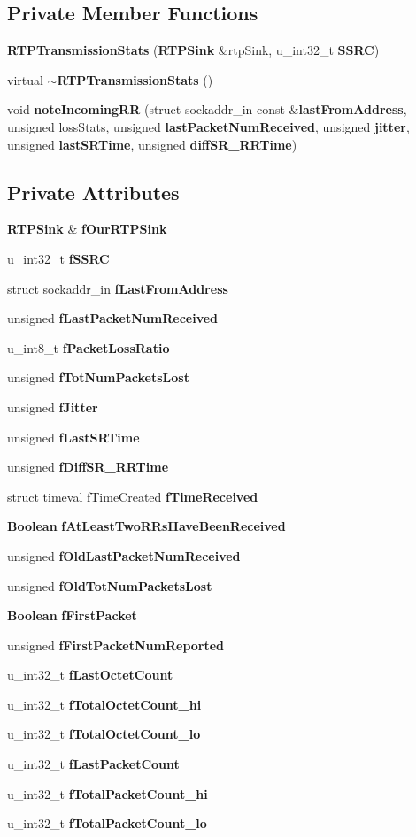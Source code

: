 \subsection*{Private Member Functions}
\begin{DoxyCompactItemize}
\item 
{\bf R\+T\+P\+Transmission\+Stats} ({\bf R\+T\+P\+Sink} \&rtp\+Sink, u\+\_\+int32\+\_\+t {\bf S\+S\+R\+C})
\item 
virtual {\bf $\sim$\+R\+T\+P\+Transmission\+Stats} ()
\item 
void {\bf note\+Incoming\+R\+R} (struct sockaddr\+\_\+in const \&{\bf last\+From\+Address}, unsigned loss\+Stats, unsigned {\bf last\+Packet\+Num\+Received}, unsigned {\bf jitter}, unsigned {\bf last\+S\+R\+Time}, unsigned {\bf diff\+S\+R\+\_\+\+R\+R\+Time})
\end{DoxyCompactItemize}
\subsection*{Private Attributes}
\begin{DoxyCompactItemize}
\item 
{\bf R\+T\+P\+Sink} \& {\bf f\+Our\+R\+T\+P\+Sink}
\item 
u\+\_\+int32\+\_\+t {\bf f\+S\+S\+R\+C}
\item 
struct sockaddr\+\_\+in {\bf f\+Last\+From\+Address}
\item 
unsigned {\bf f\+Last\+Packet\+Num\+Received}
\item 
u\+\_\+int8\+\_\+t {\bf f\+Packet\+Loss\+Ratio}
\item 
unsigned {\bf f\+Tot\+Num\+Packets\+Lost}
\item 
unsigned {\bf f\+Jitter}
\item 
unsigned {\bf f\+Last\+S\+R\+Time}
\item 
unsigned {\bf f\+Diff\+S\+R\+\_\+\+R\+R\+Time}
\item 
struct timeval f\+Time\+Created {\bf f\+Time\+Received}
\item 
{\bf Boolean} {\bf f\+At\+Least\+Two\+R\+Rs\+Have\+Been\+Received}
\item 
unsigned {\bf f\+Old\+Last\+Packet\+Num\+Received}
\item 
unsigned {\bf f\+Old\+Tot\+Num\+Packets\+Lost}
\item 
{\bf Boolean} {\bf f\+First\+Packet}
\item 
unsigned {\bf f\+First\+Packet\+Num\+Reported}
\item 
u\+\_\+int32\+\_\+t {\bf f\+Last\+Octet\+Count}
\item 
u\+\_\+int32\+\_\+t {\bf f\+Total\+Octet\+Count\+\_\+hi}
\item 
u\+\_\+int32\+\_\+t {\bf f\+Total\+Octet\+Count\+\_\+lo}
\item 
u\+\_\+int32\+\_\+t {\bf f\+Last\+Packet\+Count}
\item 
u\+\_\+int32\+\_\+t {\bf f\+Total\+Packet\+Count\+\_\+hi}
\item 
u\+\_\+int32\+\_\+t {\bf f\+Total\+Packet\+Count\+\_\+lo}
\end{DoxyCompactItemize}
